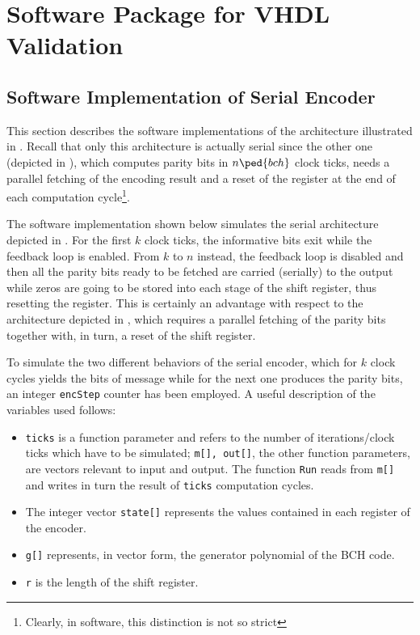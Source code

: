 \chapter{Software Package for VHDL Validation} \label{ch:SWForVDL}


\section{Software Implementation of Serial Encoder}

This section describes the software implementations of the architecture illustrated in . Recall that only this architecture is actually serial since the other one (depicted in ), which computes parity bits in \(n\ped{bch}\) clock ticks, needs a parallel fetching of the encoding result and a reset of the register at the end of each computation cycle\footnote{Clearly, in software, this distinction is not so strict}.

The software implementation shown below simulates the serial architecture depicted in . For the first \(k\) clock ticks, the informative bits exit while the feedback loop is enabled. From \(k\) to \(n\) instead, the feedback loop is disabled and then all the parity bits ready to be fetched are carried (serially) to the output while zeros are going to be stored into each stage of the shift register, thus resetting the register. This is certainly an advantage with respect to the architecture depicted in , which requires a parallel fetching of the parity bits together with, in turn, a reset of the shift register.

To simulate the two different behaviors of the serial encoder, which for \(k\) clock cycles yields the bits of message while for the next one produces the parity bits, an integer \texttt{encStep} counter has been employed. A useful description of the variables used follows:
\begin{itemize}
\item \texttt{ticks} is a function parameter and refers to the number of iterations/clock ticks which have to be simulated; \texttt{m[], out[]}, the other function parameters, are vectors relevant to input and output. The function \texttt{Run} reads from \texttt{m[]} and writes in turn the result of \texttt{ticks} computation cycles.
\item The integer vector \texttt{state[]} represents the values contained in each register of the encoder.
\item \texttt{g[]} represents, in vector form, the generator polynomial of the BCH code.
\item \texttt{r} is the length of the shift register.
\end{itemize}

